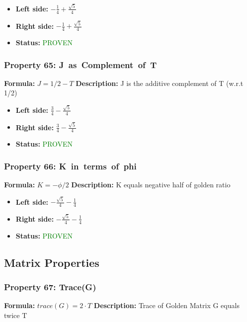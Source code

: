 \begin{itemize}
\item \textbf{Left side:} $- \frac{1}{4} + \frac{\sqrt{5}}{4}$
\item \textbf{Right side:} $- \frac{1}{4} + \frac{\sqrt{5}}{4}$
\item \textbf{Status:} \textcolor{green}{PROVEN}
\end{itemize}

\subsubsection*{Property 65: J~as~Complement~of~T}
\textbf{Formula:} $J = 1/2 - T$
\textbf{Description:} J is the additive complement of T (w.r.t 1/2)

\begin{itemize}
\item \textbf{Left side:} $\frac{3}{4} - \frac{\sqrt{5}}{4}$
\item \textbf{Right side:} $\frac{3}{4} - \frac{\sqrt{5}}{4}$
\item \textbf{Status:} \textcolor{green}{PROVEN}
\end{itemize}

\subsubsection*{Property 66: K~in~terms~of~phi}
\textbf{Formula:} $K = -\phi/2$
\textbf{Description:} K equals negative half of golden ratio

\begin{itemize}
\item \textbf{Left side:} $- \frac{\sqrt{5}}{4} - \frac{1}{4}$
\item \textbf{Right side:} $- \frac{\sqrt{5}}{4} - \frac{1}{4}$
\item \textbf{Status:} \textcolor{green}{PROVEN}
\end{itemize}


\subsection{Matrix Properties}

\subsubsection*{Property 67: Trace(G)}
\textbf{Formula:} $trace(G) = 2 \cdot T$
\textbf{Description:} Trace of Golden Matrix G equals twice T

